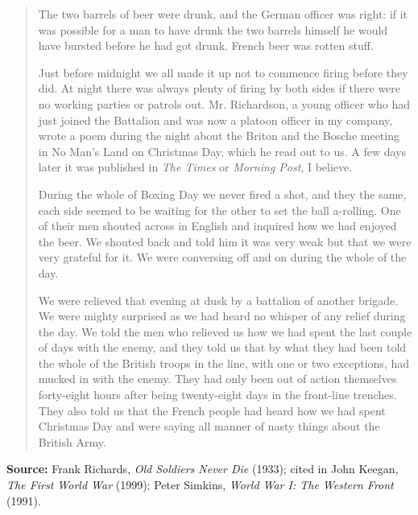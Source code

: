 \begin{quote}
The two barrels of beer were drunk, and the German officer was right: if it was possible for a man to have drunk the two barrels himself he would have bursted before he had got drunk. French beer was rotten stuff.

Just before midnight we all made it up not to commence firing before they did. At night there was always plenty of firing by both sides if there were no working parties or patrols out. Mr. Richardson, a young officer who had just joined the Battalion and was now a platoon officer in my company, wrote a poem during the night about the Briton and the Bosche meeting in No Man’s Land on Christmas Day, which he read out to us. A few days later it was published in \textit{The Times} or \textit{Morning Post}, I believe.

During the whole of Boxing Day we never fired a shot, and they the same, each side seemed to be waiting for the other to set the ball a-rolling. One of their men shouted across in English and inquired how we had enjoyed the beer. We shouted back and told him it was very weak but that we were very grateful for it. We were conversing off and on during the whole of the day.

We were relieved that evening at dusk by a battalion of another brigade. We were mighty surprised as we had heard no whisper of any relief during the day. We told the men who relieved us how we had spent the last couple of days with the enemy, and they told us that by what they had been told the whole of the British troops in the line, with one or two exceptions, had mucked in with the enemy. They had only been out of action themselves forty-eight hours after being twenty-eight days in the front-line trenches. They also told us that the French people had heard how we had spent Christmas Day and were saying all manner of nasty things about the British Army.
\end{quote}

\vspace{0.5em}

\noindent\textbf{Source:} Frank Richards, \textit{Old Soldiers Never Die} (1933); cited in John Keegan, \textit{The First World War} (1999); Peter Simkins, \textit{World War I: The Western Front} (1991).
